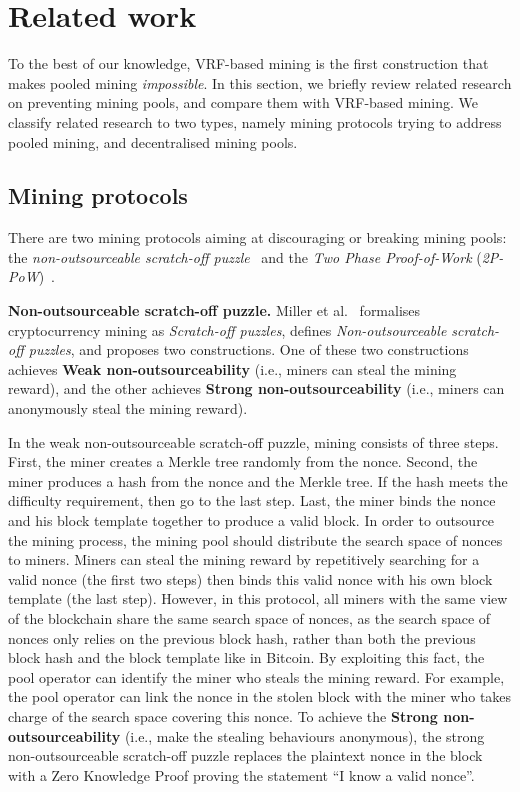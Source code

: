 \section{Related work}
\label{sec:related}

To the best of our knowledge, VRF-based mining is the first construction that makes pooled mining \textit{impossible}.
In this section, we briefly review related research on preventing mining pools, and compare them with VRF-based mining.
We classify related research to two types, namely mining protocols trying to address pooled mining, and decentralised mining pools.

\subsection{Mining protocols}

There are two mining protocols aiming at discouraging or breaking mining pools: the \textit{non-outsourceable scratch-off puzzle}~\cite{miller2015nonoutsourceable} and the \textit{Two Phase Proof-of-Work} (\textit{2P-PoW})~\cite{2P-PoW}.

\textbf{Non-outsourceable scratch-off puzzle.}
Miller et al.~\cite{miller2015nonoutsourceable} formalises cryptocurrency mining as \textit{Scratch-off puzzles}, defines \textit{Non-outsourceable scratch-off puzzles}, and proposes two constructions.
One of these two constructions achieves \textbf{Weak non-outsourceability} (i.e., miners can steal the mining reward), and the other achieves \textbf{Strong non-outsourceability} (i.e., miners can anonymously steal the mining reward).

In the weak non-outsourceable scratch-off puzzle, mining consists of three steps.
First, the miner creates a Merkle tree randomly from the nonce.
Second, the miner produces a hash from the nonce and the Merkle tree.
If the hash meets the difficulty requirement, then go to the last step.
Last, the miner binds the nonce and his block template together to produce a valid block.
In order to outsource the mining process, the mining pool should distribute the search space of nonces to miners.
Miners can steal the mining reward by repetitively searching for a valid nonce (the first two steps) then binds this valid nonce with his own block template (the last step).
However, in this protocol, all miners with the same view of the blockchain share the same search space of nonces, as the search space of nonces only relies on the previous block hash, rather than both the previous block hash and the block template like in Bitcoin.
By exploiting this fact, the pool operator can identify the miner who steals the mining reward.
For example, the pool operator can link the nonce in the stolen block with the miner who takes charge of the search space covering this nonce.
To achieve the \textbf{Strong non-outsourceability} (i.e., make the stealing behaviours anonymous), the strong non-outsourceable scratch-off puzzle replaces the plaintext nonce in the block with a Zero Knowledge Proof proving the statement ``I know a valid nonce''.

